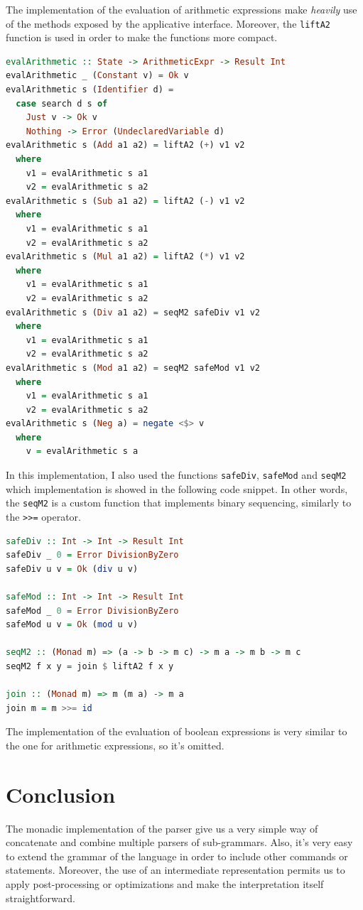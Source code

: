 \documentclass[12pt,a4paper]{article}
\begin{document}
The implementation of the evaluation of arithmetic expressions make \textit{heavily} use of the methods exposed by the applicative interface.
Moreover, the \texttt{liftA2} function is used in order to make the functions more compact.
\begin{lstlisting}[language=Haskell, style=custom-style]
evalArithmetic :: State -> ArithmeticExpr -> Result Int
evalArithmetic _ (Constant v) = Ok v
evalArithmetic s (Identifier d) =
  case search d s of
    Just v -> Ok v
    Nothing -> Error (UndeclaredVariable d)
evalArithmetic s (Add a1 a2) = liftA2 (+) v1 v2
  where
    v1 = evalArithmetic s a1
    v2 = evalArithmetic s a2
evalArithmetic s (Sub a1 a2) = liftA2 (-) v1 v2
  where
    v1 = evalArithmetic s a1
    v2 = evalArithmetic s a2
evalArithmetic s (Mul a1 a2) = liftA2 (*) v1 v2
  where
    v1 = evalArithmetic s a1
    v2 = evalArithmetic s a2
evalArithmetic s (Div a1 a2) = seqM2 safeDiv v1 v2
  where
    v1 = evalArithmetic s a1
    v2 = evalArithmetic s a2
evalArithmetic s (Mod a1 a2) = seqM2 safeMod v1 v2
  where
    v1 = evalArithmetic s a1
    v2 = evalArithmetic s a2
evalArithmetic s (Neg a) = negate <$> v
  where
    v = evalArithmetic s a
\end{lstlisting}
In this implementation, I also used the functions \texttt{safeDiv}, \texttt{safeMod} and \texttt{seqM2} which implementation is showed in the following code snippet.
In other words, the \texttt{seqM2} is a custom function that implements binary sequencing, similarly to the \texttt{>>=} operator.
\begin{lstlisting}[language=Haskell, style=custom-style]
safeDiv :: Int -> Int -> Result Int
safeDiv _ 0 = Error DivisionByZero
safeDiv u v = Ok (div u v)

safeMod :: Int -> Int -> Result Int
safeMod _ 0 = Error DivisionByZero
safeMod u v = Ok (mod u v)

seqM2 :: (Monad m) => (a -> b -> m c) -> m a -> m b -> m c
seqM2 f x y = join $ liftA2 f x y

join :: (Monad m) => m (m a) -> m a
join m = m >>= id
\end{lstlisting}
The implementation of the evaluation of boolean expressions is very similar to the one for arithmetic expressions, so it's omitted.

\section*{Conclusion}
The monadic implementation of the parser give us a very simple way of concatenate and combine multiple parsers of sub-grammars.
Also, it's very easy to extend the grammar of the language in order to include other commands or statements.
Moreover, the use of an intermediate representation permits us to apply post-processing or optimizations and make the interpretation itself straightforward.
\end{document}
